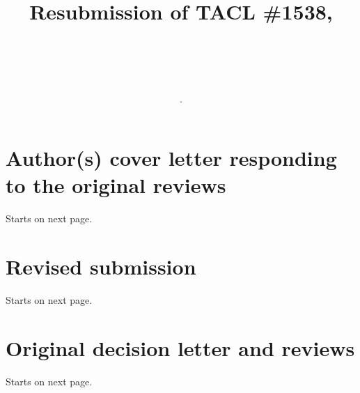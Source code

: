 \documentclass{article}[11pt,a4paper,oneside]
\title{Resubmission of TACL \#1538, \\ \subtitle.   \\}
\newcommand{\resubmission}{new-paper.pdf}  %
\newcommand{\origdecision}{decision.pdf}  %
\newcommand{\coverfile}{our-cover-letter.pdf}  %
\begin{document}
\maketitle

\tableofcontents

\section{Author(s) cover letter responding to the original reviews} Starts on next page.

\section{Revised submission} Starts on next page.

\section{Original decision letter and reviews} Starts on next page.

\end{document}
